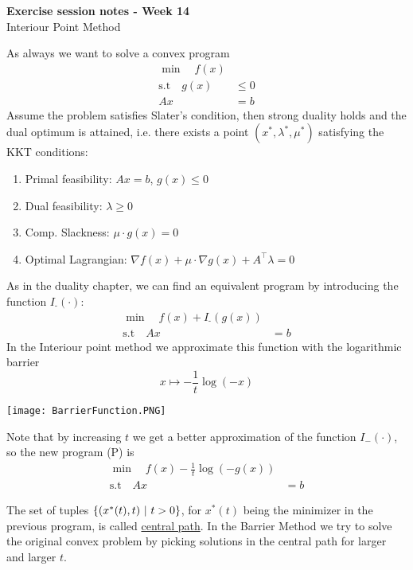 \documentclass[answers]{exam}
\begin{document}
	$ $
	\begin{center}
		\huge \textbf{Exercise session notes - Week 14}  \\ \vspace*{3mm}
        \Large{Interiour Point Method}
	\end{center}
	$ $\\

    As always we want to solve a convex program
    \begin{align*}
        \min\quad f(x)& \\ 
        \text{s.t} \quad g(x) &\leq 0 \\
        Ax &= b 
    \end{align*}
    Assume the problem satisfies Slater's condition, then strong duality holds and the dual optimum is attained, i.e. there exists a point $(x^*, \lambda^*, \mu^*)$ satisfying the KKT conditions:
    \begin{enumerate}
        \item Primal feasibility: $Ax = b$, $g(x) \leq 0$
        \item Dual feasibility: $\lambda \geq 0$
        \item Comp. Slackness: $\mu\cdot g(x) = 0$ 
        \item Optimal Lagrangian: $\nabla f(x) + \mu\cdot \nabla g(x) + A^\top \lambda = 0$ 
    \end{enumerate} 
    As in the duality chapter, we can find an equivalent program by introducing the function $I_{\text{-}}(\cdot)$:
    \begin{align*}
        \min\quad f(x) + I_{\text{-}}(g(x))& \\ 
        \text{s.t} \quad Ax &= b
    \end{align*}
    In the Interiour point method we approximate this function with the logarithmic barrier 
    $$ x\mapsto -\frac{1}{t} \log(-x) $$
    
    \begin{center}
        \texttt{[image: BarrierFunction.PNG]}
    \end{center}
    Note that by increasing $t$ we get a better approximation of the function $I_{-}(\cdot)$, so the new program (P) is 
    \begin{align*}
        \min\quad f(x) - \tfrac{1}{t} \log(-g(x)) & \\ 
        \text{s.t} \quad Ax &= b
    \end{align*}

    The set of tuples $\left\{(x^*(t),t) \ \middle|\ t>0\right\}$, for $x^*(t)$ being the minimizer in the previous program, is called \underline{central path}. In the Barrier Method we try to solve the original convex problem by picking solutions in the central path for larger and larger $t$. 
\end{document}

